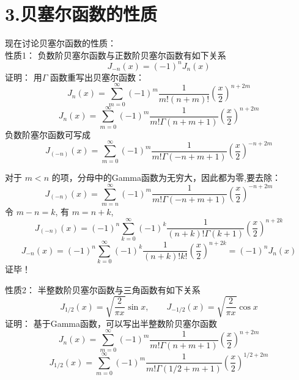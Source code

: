 \section{3.贝塞尔函数的性质}


	现在讨论贝塞尔函数的性质：\\
	{\alert{性质1：}} 负数阶贝塞尔函数与正数阶贝塞尔函数有如下关系
	\begin{equation*}
		J_{-n}(x)=(-1)^n J_n(x)
	\end{equation*}	
	{\alert{证明：} } 
	用$\Gamma$ 函数重写出贝塞尔函数：
	\begin{equation*}
		J_n(x) = \sum\limits_{m=0}^{\infty} (-1)^m  \frac{1}{m! (n+m) ! } (\frac{x}{2})^{n+2m} 
	\end{equation*}	
	\begin{equation*}
		J_n(x) = \sum\limits_{m=0}^{\infty} (-1)^m  \frac{1}{m! \Gamma(n+m+1) } (\frac{x}{2})^{n+2m} 
	\end{equation*}	
	负数阶塞尔函数可写成
	\begin{equation*}
		J_{(-n)}(x) = \sum\limits_{m=0}^{\infty} (-1)^m  \frac{1}{m! \Gamma(-n+m+1) } (\frac{x}{2})^{-n+2m} 
	\end{equation*}	



	对于 $m<n$ 的项，分母中的Gamma函数为无穷大，因此都为零,要去除：
	\begin{equation*}
		J_{(-n)}(x) = \sum\limits_{m=n}^{\infty} (-1)^m  \frac{1}{m! \Gamma(-n+m+1) } (\frac{x}{2})^{-n+2m} 
	\end{equation*}	
	令 $m-n=k$, 有 $m=n+k $, 
	\begin{equation*}
		J_{(-n)}(x) = (-1)^n\sum\limits_{k=0}^{\infty} (-1)^k  \frac{1}{(n+k)! \Gamma(k+1) } (\frac{x}{2})^{n+2k} 
	\end{equation*}	
	\begin{equation*}
		J_{-n} (x) = (-1)^n\sum\limits_{k=0}^{\infty} (-1)^k  \frac{1}{(n+k)! k! } (\frac{x}{2})^{n+2k} =(-1)^n J_{n} (x)
	\end{equation*}	
	证毕！



	{\alert{性质2：}} 半整数阶贝塞尔函数与三角函数有如下关系
	\begin{equation*}
		J_{1/2} (x) =\sqrt{\frac{2}{\pi x}} \sin x,  \qquad  J_{-1/2} (x) =\sqrt{\frac{2}{\pi x}} \cos x
	\end{equation*}	
	{\alert{证明：} } 基于Gamma函数，可以写出半整数阶贝塞尔函数
	\begin{equation*}
		J_n(x) = \sum\limits_{m=0}^{\infty} (-1)^m  \frac{1}{m! \Gamma(n+m+1) } (\frac{x}{2})^{n+2m} 
	\end{equation*}	
	\begin{equation*}
		J_{1/2}(x) = \sum\limits_{m=0}^{\infty} (-1)^m  \frac{1}{m! \Gamma(1/2+m+1) } (\frac{x}{2})^{1/2+2m} 
	\end{equation*}	



